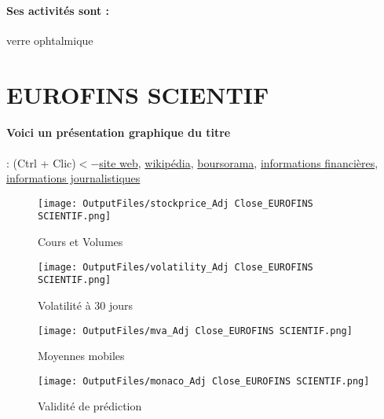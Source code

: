 \documentclass[11pt,a4paper]{report}%
\begin{document}
\paragraph{Ses activités sont : } verre ophtalmique 
    
    \newpage

\section{EUROFINS SCIENTIF}

\paragraph{Voici un présentation graphique du titre} : (Ctrl + Clic)$<-$\href{https://www.eurofins.com/investors/}{site web}, \href{https://fr.wikipedia.org/wiki/Eurofins_Scientific}{wikipédia}, \href{https://www.boursorama.com/cours/1rPERF}{boursorama}, \href{https://www.qwant.com/?q=site:https:%2f%2fwww.easybourse.com%2faction-societe%2fEUROFINS-SCIENTIF&t=web&client=ext-firefox-hp}{informations financières}, \href{https://bourse.lerevenu.com/cours-de-bourse/fiche-valeur-synthese/EUROFINS-SCIENTIF/ERF-FR}{informations journalistiques}
\begin{figure}[!htb]
   \begin{minipage}{0.5\textwidth}
     \centering
     \texttt{[image: OutputFiles/stockprice\_Adj Close\_EUROFINS SCIENTIF.png]}
     \caption{Cours et Volumes}\label{Fig:price_EUROFINS SCIENTIF}
   \end{minipage}\hfill
   \begin{minipage}{0.5\textwidth}
     \centering
     \texttt{[image: OutputFiles/volatility\_Adj Close\_EUROFINS SCIENTIF.png]}
     \caption{Volatilité à 30 jours}\label{Fig:volat_EUROFINS SCIENTIF}
   \end{minipage}
\end{figure}
\begin{figure}[!htb]
   \begin{minipage}{0.5\textwidth}
     \centering
     \texttt{[image: OutputFiles/mva\_Adj Close\_EUROFINS SCIENTIF.png]}
     \caption{Moyennes mobiles}\label{Fig:mva_EUROFINS SCIENTIF}
   \end{minipage}\hfill
   \begin{minipage}{0.5\textwidth}
     \centering
     \texttt{[image: OutputFiles/monaco\_Adj Close\_EUROFINS SCIENTIF.png]}
     \caption{Validité de prédiction}\label{Fig:prediction_EUROFINS SCIENTIF}
   \end{minipage}
\end{figure}
\end{document}

